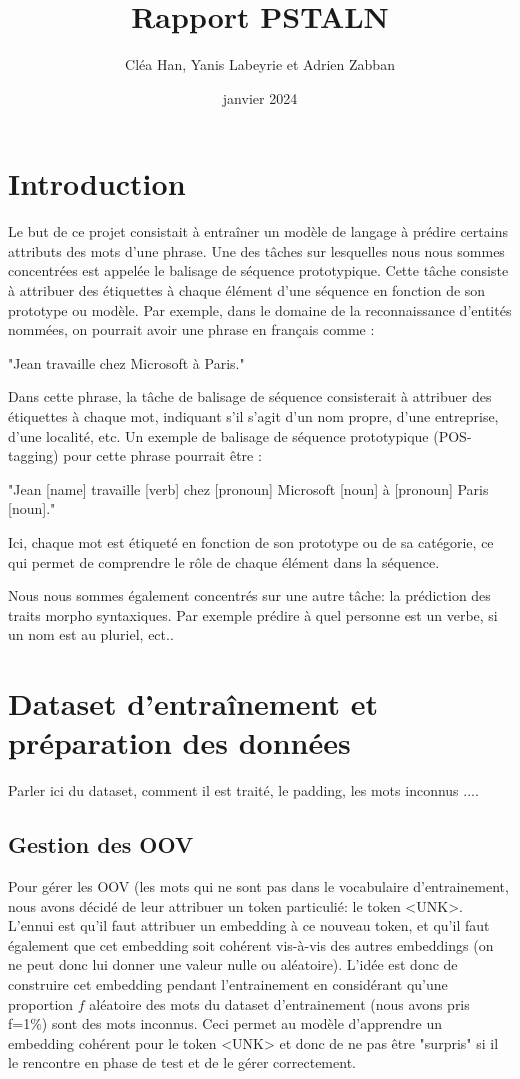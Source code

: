 \documentclass[a4paper]{article}
\title{Rapport PSTALN}
\author{Cléa Han, Yanis Labeyrie et Adrien Zabban}
\date{janvier 2024}
\begin{document}
\maketitle

\section{Introduction}

Le but de ce projet consistait à entraîner un modèle de langage à prédire certains attributs des mots d'une
phrase. Une des tâches sur lesquelles nous nous sommes concentrées est appelée le balisage de séquence
prototypique. Cette tâche consiste à attribuer des étiquettes à chaque élément d'une séquence en fonction
de son prototype ou modèle. Par exemple, dans le domaine de la reconnaissance d'entités nommées,
on pourrait avoir une phrase en français comme :

"Jean travaille chez Microsoft à Paris."    

Dans cette phrase, la tâche de balisage de séquence consisterait à attribuer des étiquettes à chaque mot,
indiquant s'il s'agit d'un nom propre, d'une entreprise, d'une localité, etc. Un exemple de balisage de
séquence prototypique (POS-tagging) pour cette phrase pourrait être :

"Jean [name] travaille [verb] chez [pronoun] Microsoft [noun] à [pronoun] Paris [noun]."

Ici, chaque mot est étiqueté en fonction de son prototype ou de sa catégorie, ce qui permet de comprendre
le rôle de chaque élément dans la séquence. 

Nous nous sommes également concentrés sur une autre tâche: la prédiction des traits morpho syntaxiques.
Par exemple prédire à quel personne est un verbe, si un nom est au pluriel, ect..


\section{Dataset d'entraînement et préparation des données}

Parler ici du dataset, comment il est traité, le padding, les mots inconnus ....

\subsection{Gestion des OOV}

Pour gérer les OOV (les mots qui ne sont pas dans le vocabulaire d'entrainement, nous avons décidé de leur
attribuer un token particulié: le token <UNK>. L'ennui est qu'il faut attribuer un embedding à ce nouveau 
token, et qu'il faut également que cet embedding soit cohérent vis-à-vis des autres embeddings (on ne peut donc 
lui donner une valeur nulle ou aléatoire). L'idée est donc de construire cet embedding pendant l'entrainement en 
considérant qu'une proportion $f$ aléatoire des mots du dataset d'entrainement (nous avons pris f=1\%) sont des 
mots inconnus. Ceci permet au modèle d'apprendre un embedding cohérent pour le token <UNK> et donc de ne pas 
être "surpris" si il le rencontre en phase de test et de le gérer correctement.
\end{document}
